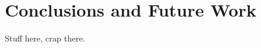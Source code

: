 \documentclass[conference]{IEEEtran}
\begin{document}
\section{Conclusions and Future Work}\label{sec:conclusion}
Stuff here, crap there.

\ifCLASSOPTIONcaptionsoff
  \newpage
\fi

\tiny

%
%

\end{document}
